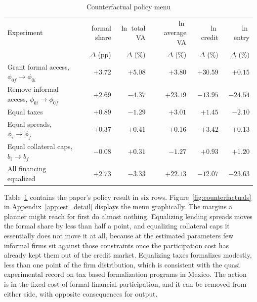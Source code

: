 \documentclass[12pt]{article}
\begin{document}
\begin{table}[H]
    \centering\footnotesize
    \caption{Counterfactual policy menu}
    \label{tab:counterfactual}
    \begin{tabular}{lrrrrr}
        \toprule
        Experiment  & formal share & $\ln$ total VA & $\ln$ average VA & $\ln$ credit & $\ln$ entry \\
         & $\Delta$ (pp) & $\Delta$ (\%) & $\Delta$ (\%) & $\Delta$ (\%) & $\Delta$ (\%) \\
        \midrule
        Grant formal access, $\phi_{0f}\to\phi_{0i}$ & $+3.72$ & $+5.08$ & $+3.80$ & $+30.59$ & $+0.15$ \\
        Remove informal access, $\phi_{0i}\to\phi_{0f}$ & $+2.69$ & $-4.37$ & $+23.19$ & $-13.95$ & $-24.54$ \\
        Equal taxes & $+0.89$ & $-1.29$ & $+3.01$ & $+1.45$ & $-2.10$ \\
        Equal spreads, $\phi_{i}\to\phi_{f}$ & $+0.37$ & $+0.41$ & $+0.16$ & $+3.42$ & $+0.13$ \\
        Equal collateral caps, $b_{i}\to b_{f}$ & $-0.08$ & $+0.31$ & $-1.27$ & $+0.93$ & $+1.20$ \\
        All financing equalized & $+2.73$ & $-3.33$ & $+22.13$ & $-12.07$ & $-23.63$ \\
        \bottomrule
    \end{tabular}
\end{table}

Table~\ref{tab:counterfactual} contains the paper's policy result in six rows. Figure~\ref{fig:counterfactuals} in Appendix~\ref{app:est_detail} displays the menu graphically. The margins a planner might reach for first do almost nothing. Equalizing lending spreads moves the formal share by less than half a point, and equalizing collateral caps it essentially does not move it at all, because at the estimated parameters few informal firms sit against those constraints once the participation cost has already kept them out of the credit market. Equalizing taxes formalizes modestly, less than one point of the firm distribution, which is consistent with the quasi experimental record on tax based formalization programs in Mexico. The action is in the fixed cost of formal financial participation, and it can be removed from either side, with opposite consequences for output.
\end{document}
